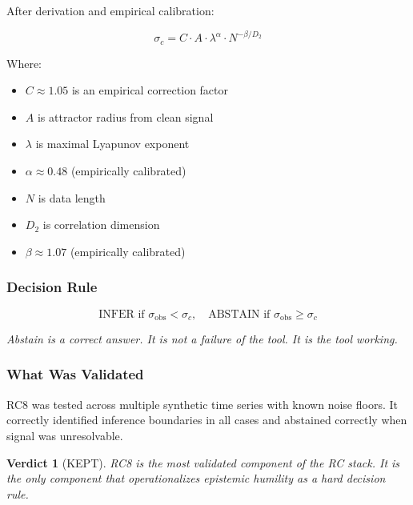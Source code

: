 \documentclass[11pt]{article}
\newtheorem{verdict}{Verdict}
\begin{document}
After derivation and empirical calibration:

\begin{equation}
  \sigma_c = C \cdot A \cdot \lambda^\alpha \cdot N^{-\beta / D_2}
\end{equation}

Where:
\begin{itemize}
  \item $C \approx 1.05$ is an empirical correction factor
  \item $A$ is attractor radius from clean signal
  \item $\lambda$ is maximal Lyapunov exponent
  \item $\alpha \approx 0.48$ (empirically calibrated)
  \item $N$ is data length
  \item $D_2$ is correlation dimension
  \item $\beta \approx 1.07$ (empirically calibrated)
\end{itemize}

\subsubsection{Decision Rule}

\begin{equation}
  \text{INFER if } \sigma_{\text{obs}} < \sigma_c, \quad \text{ABSTAIN if } \sigma_{\text{obs}} \geq \sigma_c
\end{equation}

\begin{graybox}
\textit{Abstain is a correct answer. It is not a failure of the tool. It is the tool working.}
\end{graybox}

\subsubsection{What Was Validated}

RC8 was tested across multiple synthetic time series with known noise floors. It correctly identified inference boundaries in all cases and abstained correctly when signal was unresolvable.

\begin{verdict}[\textcolor{keepgreen}{KEPT}]
RC8 is the most validated component of the RC stack. It is the only component that operationalizes epistemic humility as a hard decision rule.
\end{verdict}
\end{document}
